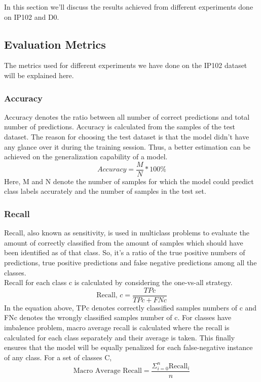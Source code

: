 In this section we’ll discuss the results achieved from different experiments done on IP102 and D0.
\subsection{Evaluation Metrics}
The metrics used for different experiments we have done on the IP102 dataset will be explained here.
\subsubsection{Accuracy}
Accuracy denotes the ratio between all number of correct predictions and total number of predictions. Accuracy is calculated from the samples of the test dataset. The reason for choosing the test dataset is that the model didn’t have any glance over it during the training session. Thus, a better estimation can be achieved on the generalization capability of a model.
\begin{equation}
    Accuracy = \frac{M}{N}*100\%
\end{equation}
Here, M and N denote the number of samples for which the model could predict class labels accurately and the number of samples in the test set.
\subsubsection{Recall}
Recall, also known as sensitivity, is used in multiclass problems to evaluate the amount of correctly classified from the amount of samples which should have been identified as of that class. So, it’s a ratio of the true positive numbers of predictions, true positive predictions and false negative predictions among all the classes.\\
Recall for each class c is calculated by considering the one-vs-all strategy.
\begin{equation}
    \text{Recall, } c = \frac{TPc}{TPc+FNc}
\end{equation}
In the equation above, TPc denotes correctly classified samples numbers of c and FNc denotes the wrongly classified samples number of c.
For classes have imbalence problem, macro average recall is calculated where the recall is calculated for each class separately and their average is taken. This finally ensures that the model will be equally penalized for each false-negative instance of any class. For a set of classes C,
\begin{equation}
    \text{Macro Average Recall} = \frac{\Sigma_{i=0}^{n} \text{Recall}_i}{n}
\end{equation}
